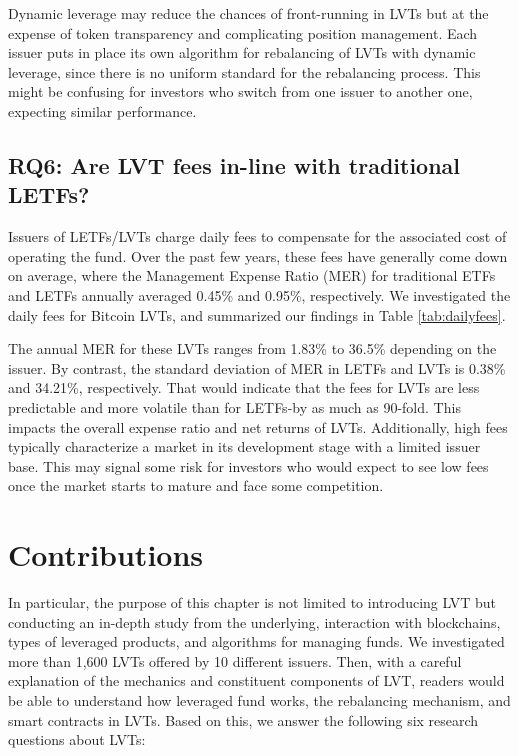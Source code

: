 Dynamic leverage may reduce the chances of front-running in LVTs but at the expense of token transparency and complicating position management. Each issuer puts in place its own algorithm for rebalancing of LVTs with dynamic leverage, since there is no uniform standard for the rebalancing process. This might be confusing for investors who switch from one issuer to another one, expecting similar performance.


\subsection*{RQ6: Are LVT fees in-line with traditional LETFs?}\label{subsec:fees}
Issuers of LETFs/LVTs charge daily fees to compensate for the associated cost of operating the fund. Over the past few years, these fees have generally come down on average, where the Management Expense Ratio (MER) for traditional ETFs and LETFs annually averaged 0.45\% and 0.95\%, respectively. We investigated the daily fees for Bitcoin LVTs, and summarized our findings in Table \ref{tab:dailyfees}. 

The annual MER for these LVTs ranges from 1.83\% to 36.5\% depending on the issuer. By contrast, the standard deviation of MER in LETFs and LVTs is 0.38\% and 34.21\%, respectively. That would indicate that the fees for LVTs are less predictable and more volatile than for LETFs-by as much as 90-fold. This impacts the overall expense ratio and net returns of LVTs. Additionally, high fees typically characterize a market in its development stage with a limited issuer base. This may signal some risk for investors who would expect to see low fees once the market starts to mature and face some competition.

\section{Contributions}
In particular, the purpose of this chapter is not limited to introducing LVT but conducting an in-depth study from the underlying, interaction with blockchains, types of leveraged products, and algorithms for managing funds. We investigated more than 1,600 LVTs offered by 10 different issuers. Then, with a careful explanation of the mechanics and constituent components of LVT, readers would be able to understand how leveraged fund works, the rebalancing mechanism, and smart contracts in LVTs. Based on this, we answer the following six research questions about LVTs:

